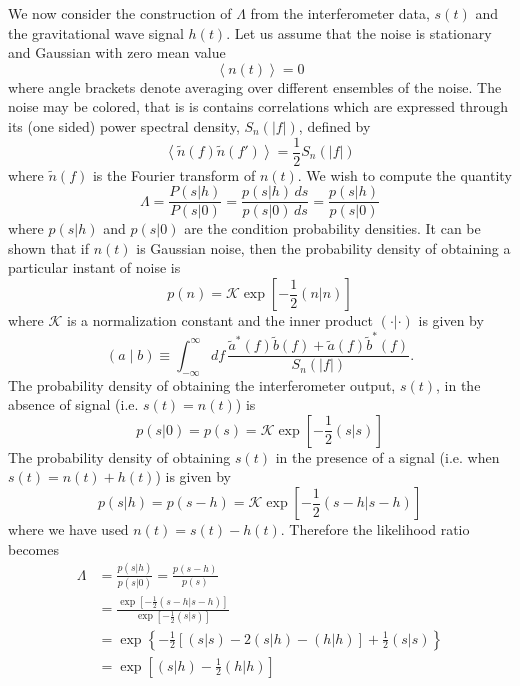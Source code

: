 We now consider the construction of $\Lambda$ from the interferometer data,
$s(t)$ and the gravitational wave signal $h(t)$. Let us assume that the noise
is stationary and Gaussian with zero mean value
\begin{equation}
\left\langle n(t) \right\rangle = 0
\end{equation}
where angle brackets denote averaging over different ensembles of the
noise. The noise may be colored, that is is contains correlations which are
expressed through its (one sided) power spectral density, $S_n(|f|)$, defined
by
\begin{equation}
\left\langle \tilde{n}(f) \tilde{n}(f') \right\rangle = \frac{1}{2} S_n(|f|)
\label{eq:ospsddef}
\end{equation}
where $\tilde{n}(f)$ is the Fourier transform of $n(t)$. We wish to compute
the quantity
\begin{equation}
\Lambda = \frac{P(s|h)}{P(s|0)} = 
\frac{p(s|h)\,ds}{p(s|0)\,ds} = \frac{p(s|h)}{p(s|0)}
\end{equation}
where $p(s|h)$ and $p(s|0)$ are the condition probability densities.  It can
be shown that if $n(t)$ is Gaussian noise, then the probability density of
obtaining a particular instant of noise is\cite{Finn:1992wt}
\begin{equation}
p(n) = \mathcal{K} \exp\left[-\frac{1}{2} (n|n)\right]
\end{equation}
where $\mathcal{K}$ is a normalization constant and the inner product
$(\cdot|\cdot)$ is given by
\begin{equation}
\label{eq:fullinnerproduct}
  (a\mid b) \equiv \int_{-\infty}^\infty df\,
  \frac{\tilde{a}^\ast(f)\tilde{b}(f)+\tilde{a}(f)\tilde{b}^\ast(f)}
       {S_n(|f|)}.
\end{equation}
The probability density of obtaining the interferometer output, $s(t)$, in the
absence of signal (i.e. $s(t) = n(t)$) is
\begin{equation}
p(s|0) = p(s) = \mathcal{K} \exp\left[-\frac{1}{2} (s|s)\right]
\end{equation}
The probability density of obtaining $s(t)$ in the presence of a signal (i.e.
when $s(t) = n(t) + h(t)$) is given by 
\begin{equation}
p(s|h) = p(s-h) = \mathcal{K} \exp\left[-\frac{1}{2} (s-h|s-h)\right]
\end{equation}
where we have used $n(t) = s(t) - h(t)$. Therefore the likelihood ratio
becomes
\begin{equation}
\begin{split}
\Lambda &= \frac{p(s|h)}{p(s|0)} = \frac{p(s-h)}{p(s)} \\
&= \frac{\exp\left[-\frac{1}{2} (s-h|s-h)\right]}{\exp\left[-\frac{1}{2} (s|s)\right]} \\
&= \exp\left\{-\frac{1}{2}\left[(s|s) - 2(s|h) - (h|h)\right] + \frac{1}{2}(s|s)\right\} \\
&= \exp\left[(s|h) - \frac{1}{2}(h|h)\right]
\end{split}
\end{equation}
